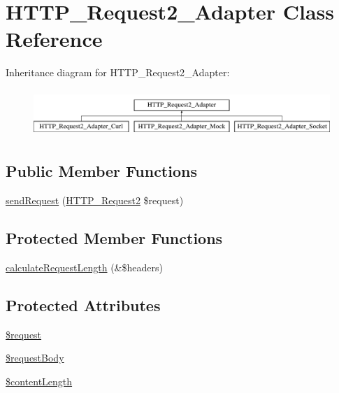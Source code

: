 \hypertarget{classHTTP__Request2__Adapter}{}\section{H\+T\+T\+P\+\_\+\+Request2\+\_\+\+Adapter Class Reference}
\label{classHTTP__Request2__Adapter}
Inheritance diagram for H\+T\+T\+P\+\_\+\+Request2\+\_\+\+Adapter\+:\begin{figure}[H]
\begin{center}
\leavevmode
\includegraphics[height=1.812298cm]{classHTTP__Request2__Adapter}
\end{center}
\end{figure}
\subsection*{Public Member Functions}
\begin{DoxyCompactItemize}
\item 
\hyperlink{classHTTP__Request2__Adapter_a4a9516fe4151ea9492952b3706f21e08}{send\+Request} (\hyperlink{classHTTP__Request2}{H\+T\+T\+P\+\_\+\+Request2} \$request)
\end{DoxyCompactItemize}
\subsection*{Protected Member Functions}
\begin{DoxyCompactItemize}
\item 
\hyperlink{classHTTP__Request2__Adapter_a046d93dce3a7735a7cc0e4564593de5d}{calculate\+Request\+Length} (\&\$headers)
\end{DoxyCompactItemize}
\subsection*{Protected Attributes}
\begin{DoxyCompactItemize}
\item 
\hyperlink{classHTTP__Request2__Adapter_ad7df680c105146f9fdd4b386220be914}{\$request}
\item 
\hyperlink{classHTTP__Request2__Adapter_acc40d409a0582abb82d8ededa68c73d7}{\$request\+Body}
\item 
\hyperlink{classHTTP__Request2__Adapter_ac8dc7108f1d54ec9b94224f57577cc3e}{\$content\+Length}
\end{DoxyCompactItemize}
